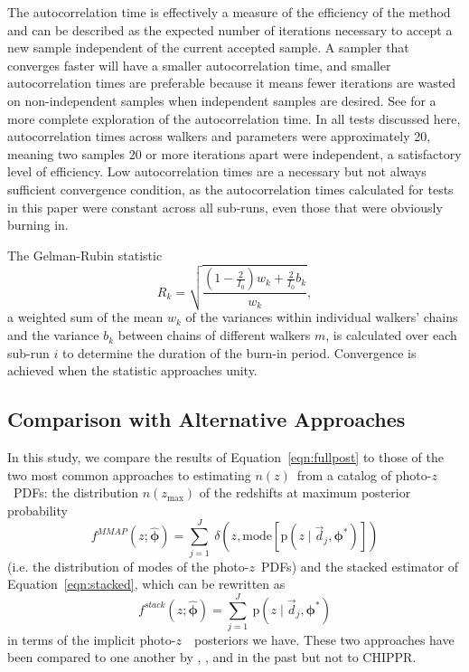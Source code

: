 \documentclass[iop]{emulateapj}
\newcommand{\Eq}[1]{Equation~\ref{#1}}
\newcommand{\project}[1]{{\textsc{#1}}}
\newcommand{\Chippr}{\project{CHIPPR}}
\newcommand{\nz}{$n(z)$}
\newcommand{\data}{\ensuremath{\vec{d}}}
\newcommand{\pr}[1]{\ensuremath{\mathrm{p}(#1)}}
\newcommand{\gvn}{\mid}%
\newcommand{\pz}{photo-$z$~}
\newcommand{\pzpdf}{\pz PDF}
\newcommand{\bvec}[1]{\ensuremath{\boldsymbol{#1}}}
\newcommand{\ndphi}{\bvec{\phi}}
\begin{document}
The autocorrelation time is effectively a measure of the efficiency of the method and can be described as the expected number of iterations necessary to accept a new sample independent of the current accepted sample.  
A sampler that converges faster will have a smaller autocorrelation time, and smaller autocorrelation times are preferable because it means fewer iterations are wasted on non-independent samples when independent samples are desired.  
See \citet{foreman-mackey_emcee_2013} for a more complete exploration of the autocorrelation time.  
In all tests discussed here, autocorrelation times across walkers and parameters were approximately 20, meaning two samples 20 or more iterations apart were independent, a satisfactory level of efficiency.  
Low autocorrelation times are a necessary but not always sufficient convergence condition, as the autocorrelation times calculated for tests in this paper were constant across all sub-runs, even those that were obviously burning in.  

The Gelman-Rubin statistic
\begin{equation}
\label{eqn:gr}
R_{k} = \sqrt{\frac{(1 - \frac{2}{I_{0}}) w_{k} + \frac{2}{I_{0}} b_{k}}{w_{k}}},
\end{equation}
a weighted sum of the mean $w_{k}$ of the variances within individual walkers' chains and the variance $b_{k}$ between chains of different walkers $m$, is calculated over each sub-run $i$ to determine the duration of the burn-in period.  
Convergence is achieved when the statistic approaches unity.  

\subsection{Comparison with Alternative Approaches}
\label{sec:sheldon}

In this study, we compare the results of \Eq{eqn:fullpost} to those of the two most common approaches to estimating \nz\ from a catalog of \pzpdf s: the distribution $n(z_{\mathrm{max}})$ of the redshifts at maximum posterior probability
\begin{equation}
\label{eqn:mmap}
f^{MMAP}(z; \hat{\ndphi}) = \sum_{j=1}^{J}\ \delta(z, \mathrm{mode}[\pr{z \gvn \data_{j}, \ndphi^{*}}])
\end{equation}
(i.e. the distribution of modes of the \pzpdf s) and the stacked estimator of \Eq{eqn:stacked}, which can be rewritten as 
\begin{equation}
\label{eqn:stacked}
f^{stack}(z; \hat{\ndphi}) = \sum_{j=1}^{J}\ \pr{z \gvn \data_{j}, \ndphi^{*}}
\end{equation}
in terms of the implicit \pz\ posteriors we have.
These two approaches have been compared to one another by \citet{hildebrandt_cfhtlens:_2012}, \citet{benjamin_cfhtlens_2013}, and \citet{asorey_galaxy_2016} in the past but not to \Chippr.
\end{document}
